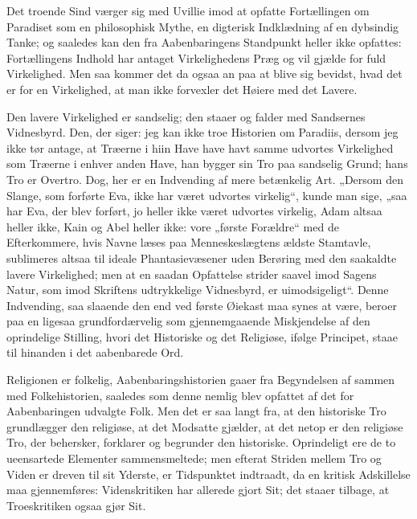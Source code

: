 \documentclass[12pt]{book}
\begin{document}
Det troende Sind værger sig med Uvillie imod at opfatte
Fortællingen om Paradiset som en philosophisk Mythe, en digterisk
Indklædning af en dybsindig Tanke; og saaledes kan den fra
Aabenbaringens Standpunkt heller ikke opfattes: Fortællingens
Indhold har antaget Virkelighedens Præg og vil gjælde for fuld
Virkelighed. Men saa kommer det da ogsaa an paa at blive sig
bevidst, hvad det er for en Virkelighed, at man ikke forvexler det
Høiere med det Lavere.

Den lavere Virkelighed er sandselig; den staaer og falder med
Sandsernes Vidnesbyrd. Den, der siger: jeg kan ikke troe Historien
om Paradiis, dersom jeg ikke tør antage, at Træerne i hiin Have have
havt samme udvortes Virkelighed som Træerne i enhver anden Have, han
bygger sin Tro paa sandselig Grund; hans Tro er Overtro.
Dog, her er en Indvending af mere betænkelig Art. „Dersom den
Slange, som forførte Eva, ikke har været udvortes virkelig“, kunde
man sige, „saa har Eva, der blev forført, jo heller ikke været
udvortes virkelig, Adam altsaa heller ikke, Kain og Abel heller
ikke: vore „første Forældre“ med de Efterkommere, hvis Navne læses
paa Menneskeslægtens ældste Stamtavle, sublimeres altsaa til ideale
Phantasievæsener uden Berøring med den saakaldte lavere
Virkelighed; men at en saadan Opfattelse strider saavel imod Sagens
Natur, som imod Skriftens udtrykkelige Vidnesbyrd, er uimodsigeligt“.
Denne Indvending, saa slaaende den end ved første Øiekast maa synes
at være, beroer paa en ligesaa grundfordærvelig som gjennemgaaende
Miskjendelse af den oprindelige Stilling, hvori det Historiske og
det Religiøse, ifølge Principet, staae til hinanden i det aabenbarede
Ord.

Religionen er folkelig, Aabenbaringshistorien gaaer fra Begyndelsen
af sammen med Folkehistorien, saaledes som denne nemlig blev opfattet
af det for Aabenbaringen udvalgte Folk. Men det er saa langt fra, at
den historiske Tro grundlægger den religiøse, at det Modsatte
gjælder, at det netop er den religiøse Tro, der behersker, forklarer
og begrunder den historiske. Oprindeligt ere de to ueensartede
Elementer sammensmeltede; men efterat Striden mellem Tro og Viden er
dreven til sit Yderste, er Tidspunktet indtraadt, da en kritisk
Adskillelse maa gjennemføres: Videnskritiken har allerede gjort Sit;
det staaer tilbage, at Troeskritiken ogsaa gjør Sit.
\end{document}
